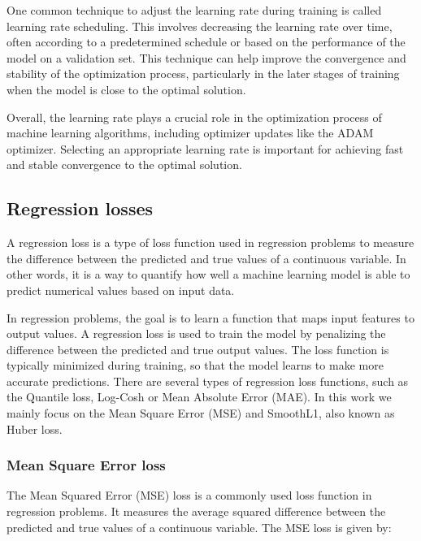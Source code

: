 One common technique to adjust the learning rate during training is called learning rate scheduling. This involves decreasing the learning rate over time, often according to a predetermined schedule or based on the performance of the model on a validation set. This technique can help improve the convergence and stability of the optimization process, particularly in the later stages of training when the model is close to the optimal solution.

Overall, the learning rate plays a crucial role in the optimization process of machine learning algorithms, including optimizer updates like the ADAM optimizer. Selecting an appropriate learning rate is important for achieving fast and stable convergence to the optimal solution.

\subsection{Regression losses}
\label{subsec:3_regression_losses}


A regression loss is a type of loss function used in regression problems to measure the difference between the predicted and true values of a continuous variable. In other words, it is a way to quantify how well a machine learning model is able to predict numerical values based on input data.

In regression problems, the goal is to learn a function that maps input features to output values. A regression loss is used to train the model by penalizing the difference between the predicted and true output values. The loss function is typically minimized during training, so that the model learns to make more accurate predictions. There are several types of regression loss functions, such as the Quantile loss, Log-Cosh or Mean Absolute Error (MAE). In this work we mainly focus on the Mean Square Error (MSE) and SmoothL1, also known as Huber loss.

\subsubsection{Mean Square Error loss}
\label{subsubsec:3_mse_loss}

The Mean Squared Error (MSE) loss is a commonly used loss function in regression problems. It measures the average squared difference between the predicted and true values of a continuous variable. The MSE loss is given by:

